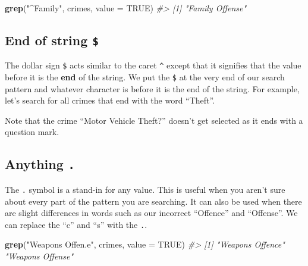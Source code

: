 \documentclass[
  12pt,
]{book}
\newenvironment{Shaded}{\begin{snugshade}}{\end{snugshade}}
\newcommand{\CommentTok}[1]{\textcolor[rgb]{0.56,0.35,0.01}{\textit{#1}}}
\newcommand{\DataTypeTok}[1]{\textcolor[rgb]{0.13,0.29,0.53}{#1}}
\newcommand{\KeywordTok}[1]{\textcolor[rgb]{0.13,0.29,0.53}{\textbf{#1}}}
\newcommand{\NormalTok}[1]{#1}
\newcommand{\OtherTok}[1]{\textcolor[rgb]{0.56,0.35,0.01}{#1}}
\newcommand{\StringTok}[1]{\textcolor[rgb]{0.31,0.60,0.02}{#1}}
\begin{document}
\begin{Shaded}
\begin{Highlighting}[]
\KeywordTok{grep}\NormalTok{(}\StringTok{"\^{}Family"}\NormalTok{, crimes, }\DataTypeTok{value =} \OtherTok{TRUE}\NormalTok{)}
\CommentTok{\#> [1] "Family Offense"}
\end{Highlighting}
\end{Shaded}

\hypertarget{end-of-string}{%
\subsection{\texorpdfstring{End of string \texttt{\$}}{End of string \$}}\label{end-of-string}}

The dollar sign \texttt{\$} acts similar to the caret \texttt{\^{}} except that it signifies that the value before it is the \textbf{end} of the string. We put the \texttt{\$} at the very end of our search pattern and whatever character is before it is the end of the string. For example, let's search for all crimes that end with the word ``Theft''.

\begin{Shaded}
\end{Shaded}

Note that the crime ``Motor Vehicle Theft?'' doesn't get selected as it ends with a question mark.

\hypertarget{anything-.}{%
\subsection{\texorpdfstring{Anything \texttt{.}}{Anything .}}\label{anything-.}}

The \texttt{.} symbol is a stand-in for any value. This is useful when you aren't sure about every part of the pattern you are searching. It can also be used when there are slight differences in words such as our incorrect ``Offence'' and ``Offense''. We can replace the ``c'' and ``s'' with the \texttt{.}.

\begin{Shaded}
\begin{Highlighting}[]
\KeywordTok{grep}\NormalTok{(}\StringTok{"Weapons Offen.e"}\NormalTok{, crimes, }\DataTypeTok{value =} \OtherTok{TRUE}\NormalTok{)}
\CommentTok{\#> [1] "Weapons Offence" "Weapons Offense"}
\end{Highlighting}
\end{Shaded}
\end{document}
